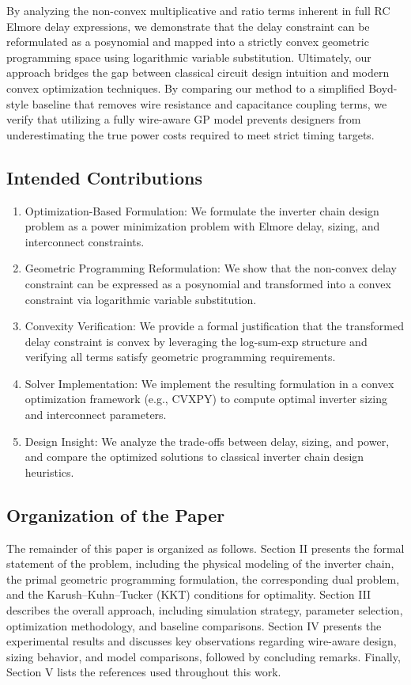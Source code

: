 \documentclass{article}
\begin{document}
	By analyzing the non-convex multiplicative and ratio terms inherent in full RC Elmore delay expressions, 
	we demonstrate that the delay constraint can be reformulated as a posynomial and mapped into a strictly 
	convex geometric programming space using logarithmic variable substitution. Ultimately, our approach 
	bridges the gap between classical circuit design intuition and modern convex optimization techniques. 
	By comparing our method to a simplified Boyd-style baseline that removes wire resistance and 
	capacitance coupling terms, we verify that utilizing a fully wire-aware GP model prevents designers 
	from underestimating the true power costs required to meet strict timing targets.


\subsection{Intended Contributions}
\begin{enumerate}
	\item Optimization-Based Formulation: We formulate the inverter chain design problem as a
	      power minimization problem with Elmore delay, sizing, and interconnect constraints.
	\item Geometric Programming Reformulation: We show that the non-convex delay constraint can
	      be expressed as a posynomial and transformed into a convex constraint via logarithmic variable
	      substitution.
	\item Convexity Verification: We provide a formal justification that the transformed delay
	      constraint is convex by leveraging the log-sum-exp structure and verifying all terms satisfy
	      geometric programming requirements.
	\item Solver Implementation: We implement the resulting formulation in a convex optimization
	      framework (e.g., CVXPY) to compute optimal inverter sizing and interconnect parameters.
	\item Design Insight: We analyze the trade-offs between delay, sizing, and power, and compare
	      the optimized solutions to classical inverter chain design heuristics.
\end{enumerate}

\subsection{Organization of the Paper}
The remainder of this paper is organized as follows. Section II presents the formal statement of the problem, including the physical modeling of the inverter chain, the primal geometric programming formulation, the corresponding dual problem, and the Karush–Kuhn–Tucker (KKT) conditions for optimality. Section III describes the overall approach, including simulation strategy, parameter selection, optimization methodology, and baseline comparisons. Section IV presents the experimental results and discusses key observations regarding wire-aware design, sizing behavior, and model comparisons, followed by concluding remarks. Finally, Section V lists the references used throughout this work.
\end{document}
